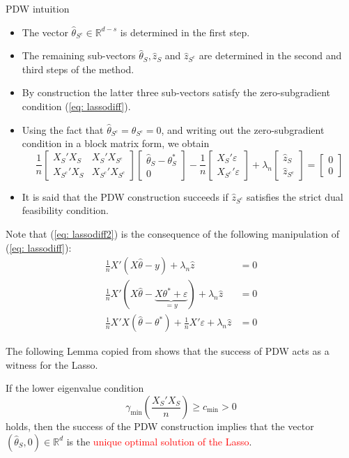 \documentclass[10pt,handout,english]{beamer}
\newcommand{\R}{\mathbb{R}}
\begin{document}
\begin{frame}[allowframebreaks]{PDW intuition}
\begin{itemize}
\item The vector $\hat{\theta}_{S^c}\in\R^{d-s}$ is determined in the first step.
\item The remaining sub-vectors $\hat{\theta}_S,\hat{z}_S$ and $\hat{z}_{S^c}$ are determined in the second and third steps of the method.\justifying 
\item By construction the latter three sub-vectors satisfy the zero-subgradient condition (\ref{eq: lassodiff}).\justifying
\item Using the fact that $\hat{\theta}_{S^c}=\theta_{S^c}=0$, and writing out the zero-subgradient condition in a block matrix form, we obtain\justifying
\begin{equation}\label{eq: lassodiff2}
\frac{1}{n}
\begin{bmatrix}
X_S'X_S& X_S'X_{S^c}\\
X_{S^c}'X_S &X_{S^c}'X_{S^c}
\end{bmatrix}
\begin{bmatrix}
\hat{\theta}_S-\theta_S^*\\
0
\end{bmatrix}
-\frac{1}{n} 
\begin{bmatrix}
X_S'\varepsilon\\
X_{S^c}'\varepsilon
\end{bmatrix}
+
\lambda_n
\begin{bmatrix}
\hat{z}_S\\
\hat{z}_{S^c}
\end{bmatrix}
=
\begin{bmatrix}
0\\
0
\end{bmatrix}
\end{equation}
\item It is said that the PDW construction succeeds if $\hat{z}_{S^c}$ satisfies the strict dual feasibility condition.\justifying 
\end{itemize}
Note that (\ref{eq: lassodiff2}) is the consequence of the following manipulation of (\ref{eq: lassodiff}):
\begin{align*}
\frac{1}{n}X'\left(X\hat{\theta}-y\right)+\lambda_n\hat{z}&=0\\
\frac{1}{n}X'\left(X\hat{\theta}-\underbrace{X\theta^*+\varepsilon}_{=y}\right)+\lambda_n\hat{z}&=0\\
\frac{1}{n}X'X\left(\hat{\theta}-\theta^*\right)+\frac{1}{n}X'\varepsilon+\lambda_n\hat{z}&=0
\end{align*}
\end{frame}
\begin{frame}
The following Lemma copied from \citet{wainwright2019high} shows that the success of PDW acts as a witness for the Lasso.
\begin{lemma}
If the lower eigenvalue condition
\[
\gamma_{\min}\left(\frac{X_S'X_S}{n}\right)\geq c_{\min}>0
\]
holds, then the success of the PDW construction implies that the vector $(\hat{\theta}_S,0)\in\R^d$ is the \textcolor{red}{unique optimal solution of the Lasso}.
\end{lemma}
\end{frame}
\end{document}

